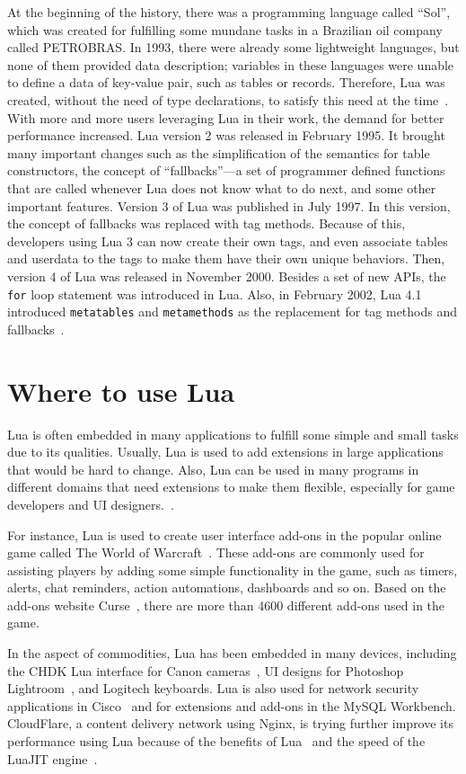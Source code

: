 At the beginning of the history, there was a programming language called ``Sol'', which was created for fulfilling some mundane tasks in a Brazilian oil company called PETROBRAS. 
In 1993, there were already some lightweight languages, but none of them provided data description; variables in these languages were unable to define a data of key-value pair, such as tables or records. Therefore, Lua was created, without the need of type declarations, to satisfy this need at the time~\cite{EOL}.
With more and more users leveraging Lua in their work, the demand for better performance increased. Lua version 2 was released in February 1995. It brought many important changes such as the simplification of the semantics for table constructors,
the concept of ``fallbacks''---a set of programmer defined functions that are called whenever Lua does not know what to do next, and some other important features. Version 3 of Lua was published in July 1997. In this version, the concept of fallbacks was replaced with tag methods. Because of this, developers using Lua 3 can now create their own tags, and even associate tables and userdata to the tags to make them have their own unique behaviors. Then, version 4 of Lua was released in November 2000. Besides a set of new APIs, the {\tt for} loop statement was introduced in Lua. 
Also, in February 2002, Lua 4.1 introduced {\tt metatables} and {\tt metamethods} as the replacement for tag methods and fallbacks~\cite{TEL}.

\section{Where to use Lua}
Lua is often embedded in many applications to fulfill some simple and small tasks due to its qualities. Usually, Lua is used to add extensions in large applications that would be hard to change. Also, Lua can be used in many programs in different domains that need extensions to make them flexible, especially for game developers and UI designers.~\cite{AIL}. 

For instance, Lua is used to create user interface add-ons in the popular online game called The World of Warcraft~\cite{WLA}. These add-ons are commonly used for assisting players by adding some simple functionality in the game, such as timers, alerts, chat reminders, action automations, dashboards and so on. Based on the add-ons website Curse~\cite{WCU}, there are more than 4600 different add-ons used in the game.

In the aspect of commodities, Lua has been embedded in many devices, including the CHDK Lua interface for Canon cameras~\cite{CLFL}, UI designs for Photoshop Lightroom~\cite{APLL}, and Logitech keyboards. Lua is also used for network security applications in Cisco~\cite{CISCO} and for extensions and add-ons in the MySQL Workbench. CloudFlare, a content delivery network using Nginx, is trying further improve its performance using Lua because of the benefits of Lua~\cite{NPL} and the speed of the LuaJIT engine~\cite{LJT}.

